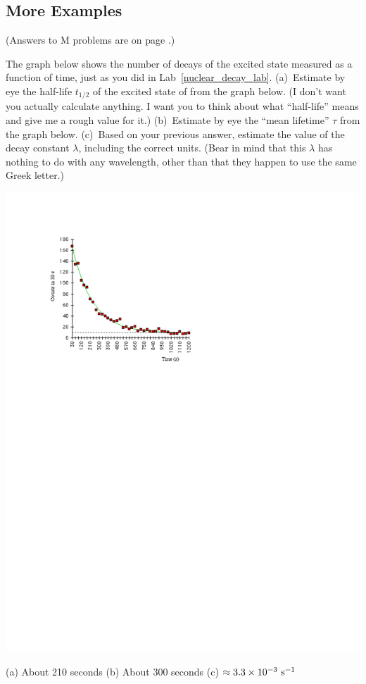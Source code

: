 \subsection{More Examples} 

(Answers to M problems are on page \pageref{examples_prob_answers}.)



\begin{Exercise}
The graph below shows the number of decays of the excited state  measured as a function of time, just as you did in Lab~\ref{nuclear_decay_lab}. (a)~Estimate by eye the half-life $t_{1/2}$ of the excited state of  from the graph below. (I don't want you actually calculate anything.  I want you to think about what ``half-life'' means and give me a rough value for it.)  (b)~Estimate by eye the ``mean lifetime'' $\tau$ from the graph below.  (c)~Based on your previous answer, estimate the value of the decay constant $\lambda$, including the correct units. (Bear in mind that this $\lambda$ has nothing to do with any wavelength, other than that they happen to use the same Greek letter.) 
\begin{center}
\includegraphics{M_problems/lorentz/barium_decay_graph.pdf}
\end{center}
 \end{Exercise}
\begin{Answer}
(a) About 210 seconds (b) About 300 seconds (c) $\approx 3.3 \times 10^{-3}~{\rm s}^{-1}$
\end{Answer}


